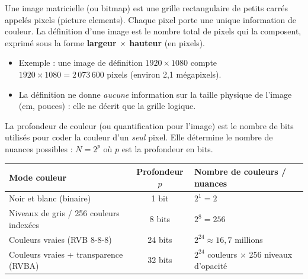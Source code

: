 \documentclass[11pt]{article}
\newcommand{\cle}[1]{{\popxbold\color{popdark}#1}}
\begin{document}
\begin{definition}
Une \cle{image matricielle} (ou bitmap) est une grille rectangulaire de petits carrés appelés \cle{pixels} (picture elements). Chaque pixel porte une unique information de couleur.
La \cle{définition} d'une image est le nombre total de pixels qui la composent, exprimé sous la forme \textbf{largeur $\times$ hauteur} (en pixels).
\begin{itemize}
\item Exemple : une image de définition $1920 \times 1080$ compte $1920 \times 1080 = 2\,073\,600$ pixels (environ 2,1 mégapixels).
\item La définition ne donne \emph{aucune} information sur la taille physique de l'image (cm, pouces) : elle ne décrit que la grille logique.
\end{itemize}
\end{definition}

\begin{propriete}
La \cle{profondeur de couleur} (ou \cle{quantification} pour l'image) est le nombre de bits utilisés pour coder la couleur d'un \emph{seul} pixel. Elle détermine le nombre de nuances possibles : $N = 2^p$ où $p$ est la profondeur en bits.
\begin{center}
\begin{tabularx}{\linewidth}{|l|c|X|}
\hline
\rowcolor{popblueL} \textbf{Mode couleur} & \textbf{Profondeur $p$} & \textbf{Nombre de couleurs / nuances} \\
\hline
Noir et blanc (binaire) & 1 bit & $2^1 = 2$ \\
\hline
Niveaux de gris / 256 couleurs indexées & 8 bits & $2^8 = 256$ \\
\hline
Couleurs vraies (RVB 8-8-8) & 24 bits & $2^{24} \approx 16,7$ millions \\
\hline
Couleurs vraies + transparence (RVBA) & 32 bits & $2^{24}$ couleurs $\times$ 256 niveaux d'opacité \\
\hline
\end{tabularx}
\end{center}
\end{propriete}
\end{document}
